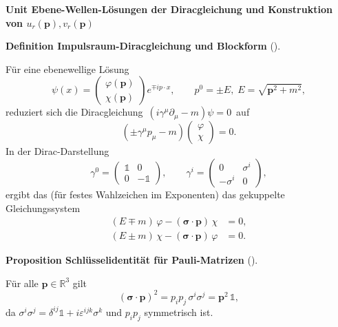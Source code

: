 \documentclass[10pt, letterpaper]{article}
\newcommand{\R}{\mathbb{R}}
\newcommand{\CustomHeading}[3]{%
  \par\medskip\noindent%
  \textbf{#1 #2} \textnormal{(#3)}.\enskip%
}
\newenvironment{DEF}[2]{\begin{unitbox}\CustomHeading{Definition}{#1}{#2}}{\end{unitbox}}
\newenvironment{PROP}[2]{\begin{unitbox}\CustomHeading{Proposition}{#1}{#2}}{\end{unitbox}}
\newenvironment{unit}[1]
  {\begin{unitbox}\textbf{Unit #1}\par\smallskip}
  {\end{unitbox}}
\begin{document}
\begin{unit}{Ebene-Wellen-Lösungen der Diracgleichung und Konstruktion von $u_r(\mathbf p),v_r(\mathbf p)$}

\begin{DEF}{Impulsraum-Diracgleichung und Blockform}{}
Für eine ebenewellige Lösung
\[
\psi(x)=\begin{pmatrix}\varphi(\mathbf p)\\ \chi(\mathbf p)\end{pmatrix}e^{\mp ip\cdot x},
\qquad p^0=\pm E,\; E=\sqrt{\mathbf p^2+m^2},
\]
reduziert sich die Diracgleichung $\,(i\gamma^\mu\partial_\mu-m)\psi=0\,$ auf
\[
(\pm \gamma^\mu p_\mu - m)\begin{pmatrix}\varphi\\ \chi\end{pmatrix}=0.
\]
In der Dirac-Darstellung
\[
\gamma^0=\begin{pmatrix}\mathbb 1&0\\0&-\mathbb 1\end{pmatrix},
\qquad
\gamma^i=\begin{pmatrix}0&\sigma^i\\ -\sigma^i&0\end{pmatrix},
\]
ergibt das (für festes Wahlzeichen im Exponenten) das gekuppelte Gleichungssystem
\begin{equation}\label{eq:block}
\begin{aligned}
(E\mp m)\,\varphi - (\boldsymbol{\sigma}\!\cdot\!\mathbf p)\,\chi &= 0,\\
(E\pm m)\,\chi - (\boldsymbol{\sigma}\!\cdot\!\mathbf p)\,\varphi &= 0.
\end{aligned}
\end{equation}
\end{DEF}

\begin{PROP}{Schlüsselidentität für Pauli-Matrizen}{}
Für alle $\mathbf p\in\R^3$ gilt
\[
(\boldsymbol{\sigma}\!\cdot\!\mathbf p)^2
= p_i p_j\,\sigma^i\sigma^j
= \mathbf p^2\,\mathbb 1,
\]
da $\sigma^i\sigma^j=\delta^{ij}\mathbb 1+i\varepsilon^{ijk}\sigma^k$ und $p_ip_j$ symmetrisch ist.
\end{PROP}


\end{unit}
\end{document}
